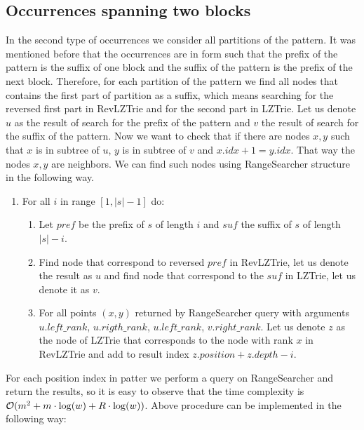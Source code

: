 \subsection{Occurrences spanning two blocks}
In the second type of occurrences we consider all partitions of the pattern. It was mentioned before that the occurrences are in form such that the prefix of the pattern is the suffix of one block and the suffix of the pattern is the prefix of the next block. Therefore, for each partition of the pattern we find all nodes that contains the first part of partition as a suffix, which means searching for the reversed first part in RevLZTrie and for the second part in LZTrie. Let us denote $u$ as the result of search for the prefix of the pattern and $v$ the result of search for the suffix of the pattern. Now we want to check that if there are nodes $x, y$ such that $x$ is in subtree of $u$, $y$ is in subtree of $v$ and $x.idx + 1 = y.idx$. That way the nodes $x, y$ are neighbors. We can find such nodes using RangeSearcher structure in the following way.

\begin{enumerate}
    \item For all $i$ in range $[1, |s|-1]$ do:
    \begin{enumerate}
        \item Let $pref$ be the prefix of $s$ of length $i$ and $suf$ the suffix of $s$ of length $|s| - i$.
        \item Find node that correspond to reversed $pref$ in RevLZTrie, let us denote the result as $u$ and find node that correspond to the $suf$ in LZTrie, let us denote it as $v$.
        \item For all points $(x, y)$ returned by RangeSearcher query with arguments \\ $u.left\_rank$, $u.rigth\_rank$, $u.left\_rank$, $v.right\_rank$. Let us denote $z$ as the node of LZTrie that corresponds to the node with rank $x$ in RevLZTrie and add to result index $z.position + z.depth - i$.
    \end{enumerate}
\end{enumerate}

For each position index in patter we perform a query on RangeSearcher and return the results, so it is easy to observe that the time complexity is $\mathcal{O}(m^2 + m \cdot \log (w) + R \cdot \log (w))$. Above procedure can be implemented in the following way:

